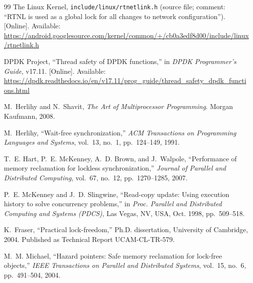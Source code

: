 \documentclass[11pt,a4paper,oneside]{report}
\begin{document}
\begin{thebibliography}{99}
The Linux Kernel, \texttt{include/linux/rtnetlink.h} (source file; comment:
``RTNL is used as a global lock for all changes to network configuration'').
[Online]. Available:
\url{https://android.googlesource.com/kernel/common/+/cb0a3edf8d00/include/linux/rtnetlink.h}

DPDK Project, ``Thread safety of DPDK functions,'' in \emph{DPDK Programmer's
Guide}, v17.11. [Online]. Available:
\url{https://dpdk.readthedocs.io/en/v17.11/prog_guide/thread_safety_dpdk_functions.html}

M.~Herlihy and N.~Shavit, \emph{The Art of Multiprocessor Programming}. Morgan
Kaufmann, 2008.

M.~Herlihy, ``Wait-free synchronization,'' \emph{ACM Transactions on
Programming Languages and Systems}, vol.~13, no.~1, pp.~124--149, 1991.

T.~E. Hart, P.~E. McKenney, A.~D. Brown, and J.~Walpole, ``Performance of memory
reclamation for lockless synchronization,'' \emph{Journal of Parallel and
Distributed Computing}, vol.~67, no.~12, pp.~1270--1285, 2007.

P.~E. McKenney and J.~D. Slingwine, ``Read-copy update: Using execution history
to solve concurrency problems,'' in \emph{Proc. Parallel and Distributed
Computing and Systems (PDCS)}, Las Vegas, NV, USA, Oct. 1998, pp.~509--518.

K.~Fraser, ``Practical lock-freedom,'' Ph.D. dissertation, University of
Cambridge, 2004. Published as Technical Report UCAM-CL-TR-579.

M.~M. Michael, ``Hazard pointers: Safe memory reclamation for lock-free
objects,'' \emph{IEEE Transactions on Parallel and Distributed Systems},
vol.~15, no.~6, pp.~491--504, 2004.

\end{thebibliography}
\endgroup
\end{document}
